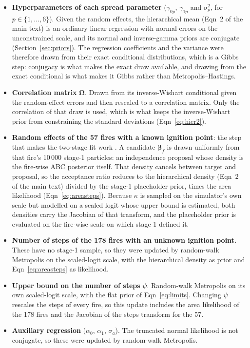 \documentclass[11pt,a4paper]{article}
\begin{document}
\begin{itemize}
\item \textbf{Hyperparameters of each spread parameter} ($\gamma_{0p}$, $\gamma_{1p}$ and
$\sigma_p^2$, for $p \in \{1, \ldots, 6\}$). Given the random effects, the hierarchical
mean (Eqn~2 of the main text) is an ordinary linear regression with normal errors on the
unconstrained scale, and its normal and inverse-gamma priors are conjugate
(Section~\ref{sec:priors}). The regression coefficients and the variance were therefore
drawn from their exact conditional distributions, which is a Gibbs step: conjugacy is
what makes the exact draw available, and drawing from the exact conditional is what
makes it Gibbs rather than Metropolis--Hastings.

\item \textbf{Correlation matrix} $\boldsymbol{\Omega}$. Drawn from its inverse-Wishart
conditional given the random-effect errors and then rescaled to a correlation matrix. Only
the correlation of that draw is used, which is what keeps the inverse-Wishart prior from
constraining the standard deviations (Eqn~\ref{eq:hier2}).

\item \textbf{Random effects of the 57 fires with a known ignition point}: the step
that makes the two-stage fit work \citep{lunn2013fully}. A candidate
$\boldsymbol{\beta}_f$ is drawn uniformly from that fire's 10\,000 stage-1 particles: an
independence proposal whose density is the fire-wise ABC posterior itself. That density cancels between
target and proposal, so the acceptance ratio reduces to the hierarchical density (Eqn~2 of
the main text) divided by the stage-1 placeholder prior, times the area likelihood
(Eqn~\ref{eq:areasteps}). Because $\kappa$ is sampled on the simulator's own scale but
modelled on a scaled logit whose upper bound is estimated, both densities carry the
Jacobian of that transform, and the placeholder prior is evaluated on the fire-wise scale
on which stage 1 defined it.

\item \textbf{Number of steps of the 178 fires with an unknown ignition point.} These have no
stage-1 sample, so they were updated by random-walk Metropolis on the scaled-logit scale,
with the hierarchical density as prior and Eqn~\ref{eq:areasteps} as likelihood.

\item \textbf{Upper bound on the number of steps} $\psi$. Random-walk Metropolis on its
own scaled-logit scale, with the flat prior of Eqn~\ref{eq:limits}. Changing $\psi$
rescales the steps of every fire, so this update includes the area likelihood of the 178
fires and the Jacobian of the steps transform for the 57.

\item \textbf{Auxiliary regression} ($\alpha_0$, $\alpha_1$, $\sigma_a$). The truncated
normal likelihood is not conjugate, so these were updated by random-walk Metropolis.
\end{itemize}
\end{document}
